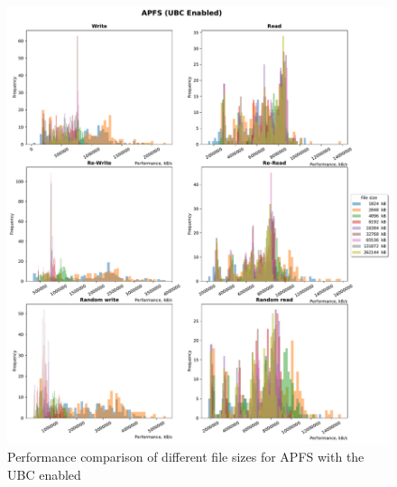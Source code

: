 \begin{figure}[!htb]
	\label{fig:bench_apfs_with_cache}
	\begin{center}
		\includegraphics[width=1.0\textwidth]{figures.nosync/benchmarking/APFS/APFS-UBC Enabled-hist.pdf}
	\end{center}
	\caption[Performance comparison for APFS with the UBC enabled]{Performance comparison of different file sizes for APFS with the UBC enabled}
\end{figure}
\clearpage
